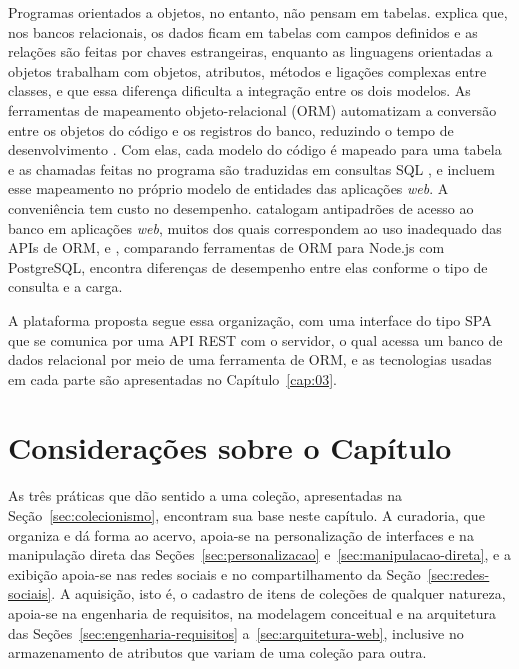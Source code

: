 Programas orientados a objetos, no entanto, não pensam em tabelas.  explica que, nos bancos relacionais, os dados
ficam em tabelas com campos definidos e as relações são feitas por chaves estrangeiras, enquanto as linguagens orientadas a objetos trabalham com objetos,
atributos, métodos e ligações complexas entre classes, e que essa diferença dificulta a integração entre os dois modelos. As ferramentas de mapeamento
objeto-relacional (ORM) automatizam a conversão entre os objetos do código e os registros do banco, reduzindo o tempo de desenvolvimento
\cite{ZhadkoBazilevych2025}. Com elas, cada modelo do código é mapeado para uma tabela e as chamadas feitas no programa são traduzidas em consultas SQL
\cite{Yang2020}, e  incluem esse mapeamento no próprio modelo de entidades das aplicações \textit{web}. A conveniência tem
custo no desempenho.  catalogam antipadrões de acesso ao banco em aplicações \textit{web}, muitos dos quais correspondem ao uso
inadequado das APIs de ORM, e , comparando ferramentas de ORM para Node.js com PostgreSQL, encontra diferenças de
desempenho entre elas conforme o tipo de consulta e a carga.

A plataforma proposta segue essa organização, com uma interface do tipo SPA que se comunica por uma API REST com o servidor, o qual acessa um banco de dados
relacional por meio de uma ferramenta de ORM, e as tecnologias usadas em cada parte são apresentadas no Capítulo~\ref{cap:03}.


\section{Considerações sobre o Capítulo}
\label{sec:consideracoes-cap02}

As três práticas que dão sentido a uma coleção, apresentadas na Seção~\ref{sec:colecionismo}, encontram sua base neste capítulo. A curadoria, que organiza e
dá forma ao acervo, apoia-se na personalização de interfaces e na manipulação direta das Seções~\ref{sec:personalizacao} e~\ref{sec:manipulacao-direta}, e a
exibição apoia-se nas redes sociais e no compartilhamento da Seção~\ref{sec:redes-sociais}. A aquisição, isto é, o cadastro de itens de coleções de qualquer
natureza, apoia-se na engenharia de requisitos, na modelagem conceitual e na arquitetura das Seções~\ref{sec:engenharia-requisitos} a~\ref{sec:arquitetura-web},
inclusive no armazenamento de atributos que variam de uma coleção para outra.

